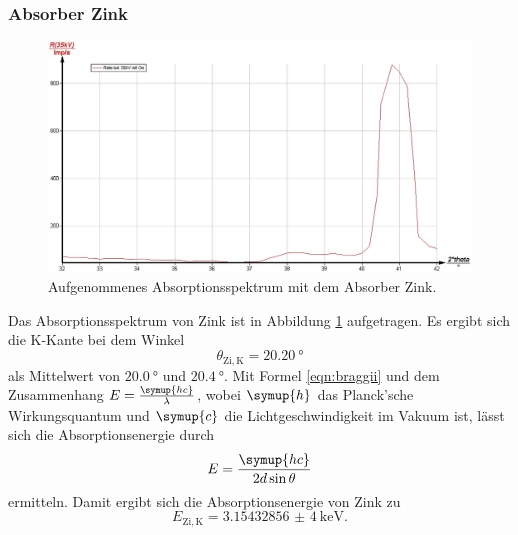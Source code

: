 \subsubsection{Absorber Zink}
\begin{figure}
	\includegraphics[width=1.0\textwidth]{nIKO_und_jULIAN_ÜLADS/zink.jpg}
	\caption{Aufgenommenes Absorptionsspektrum mit dem Absorber Zink.}
	\label{fig:zink_absorber}
\end{figure}
Das Absorptionsspektrum von Zink ist in Abbildung \ref{fig:zink_absorber} aufgetragen.
Es ergibt sich die K-Kante bei dem Winkel
\begin{equation*}
	\theta_{\mathrm{Zi,K}} = \SI{20,20}{\degree}
\end{equation*}
als Mittelwert von $\SI{20,0}{\degree}$ und $\SI{20,4}{\degree}$. 
Mit Formel \eqref{eqn:braggii} und dem Zusammenhang $E = \frac{\symup{hc}}{\lambda}$,
wobei $\symup{h}$
das Planck'sche Wirkungsquantum und $\symup{c}$ die Lichtgeschwindigkeit im Vakuum ist, lässt
sich die Absorptionsenergie durch
\begin{equation}
	\label{eqn:Absorptionsenergie}
	E = \frac{\symup{hc}}{2d\sin\theta}
\end{equation}
ermitteln.
Damit ergibt sich die Absorptionsenergie von Zink zu
\begin{equation*}
	E_{\mathrm{Zi,K}} = \SI{3,15432856(4)}{\kilo\electronvolt} \mathrm{.}
\end{equation*}

\FloatBarrier
